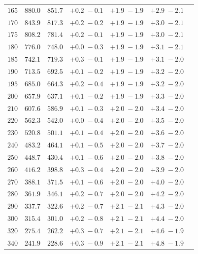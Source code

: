 \begin{table}
\begin{tabular}{ccccccc}
 $ 165$ & $  880.0$ & $  851.7$ & $ +0.2 \; -\!0.1$ & $ +1.9 \; -\!1.9$ & $ +2.9 \; -\!2.1$ \\
 $ 170$ & $  843.9$ & $  817.3$ & $ +0.2 \; -\!0.2$ & $ +1.9 \; -\!1.9$ & $ +3.0 \; -\!2.1$ \\
 $ 175$ & $  808.2$ & $  781.4$ & $ +0.2 \; -\!0.1$ & $ +1.9 \; -\!1.9$ & $ +3.0 \; -\!2.1$ \\
 $ 180$ & $  776.0$ & $  748.0$ & $ +0.0 \; -\!0.3$ & $ +1.9 \; -\!1.9$ & $ +3.1 \; -\!2.1$ \\
 $ 185$ & $  742.1$ & $  719.3$ & $ +0.3 \; -\!0.1$ & $ +1.9 \; -\!1.9$ & $ +3.1 \; -\!2.0$ \\
 $ 190$ & $  713.5$ & $  692.5$ & $ +0.1 \; -\!0.2$ & $ +1.9 \; -\!1.9$ & $ +3.2 \; -\!2.0$ \\
 $ 195$ & $  685.0$ & $  664.3$ & $ +0.2 \; -\!0.4$ & $ +1.9 \; -\!1.9$ & $ +3.2 \; -\!2.0$ \\
 $ 200$ & $  657.9$ & $  637.1$ & $ +0.1 \; -\!0.2$ & $ +1.9 \; -\!1.9$ & $ +3.3 \; -\!2.0$ \\
 $ 210$ & $  607.6$ & $  586.9$ & $ +0.1 \; -\!0.3$ & $ +2.0 \; -\!2.0$ & $ +3.4 \; -\!2.0$ \\
 $ 220$ & $  562.3$ & $  542.0$ & $ +0.0 \; -\!0.4$ & $ +2.0 \; -\!2.0$ & $ +3.5 \; -\!2.0$ \\
 $ 230$ & $  520.8$ & $  501.1$ & $ +0.1 \; -\!0.4$ & $ +2.0 \; -\!2.0$ & $ +3.6 \; -\!2.0$ \\
 $ 240$ & $  483.2$ & $  464.1$ & $ +0.1 \; -\!0.5$ & $ +2.0 \; -\!2.0$ & $ +3.7 \; -\!2.0$ \\
 $ 250$ & $  448.7$ & $  430.4$ & $ +0.1 \; -\!0.6$ & $ +2.0 \; -\!2.0$ & $ +3.8 \; -\!2.0$ \\
 $ 260$ & $  416.2$ & $  398.8$ & $ +0.3 \; -\!0.4$ & $ +2.0 \; -\!2.0$ & $ +3.9 \; -\!2.0$ \\
 $ 270$ & $  388.1$ & $  371.5$ & $ +0.1 \; -\!0.6$ & $ +2.0 \; -\!2.0$ & $ +4.0 \; -\!2.0$ \\
 $ 280$ & $  361.9$ & $  346.1$ & $ +0.2 \; -\!0.7$ & $ +2.0 \; -\!2.0$ & $ +4.2 \; -\!2.0$ \\
 $ 290$ & $  337.7$ & $  322.6$ & $ +0.2 \; -\!0.7$ & $ +2.1 \; -\!2.1$ & $ +4.3 \; -\!2.0$ \\
 $ 300$ & $  315.4$ & $  301.0$ & $ +0.2 \; -\!0.8$ & $ +2.1 \; -\!2.1$ & $ +4.4 \; -\!2.0$ \\
 $ 320$ & $  275.4$ & $  262.2$ & $ +0.3 \; -\!0.7$ & $ +2.1 \; -\!2.1$ & $ +4.6 \; -\!1.9$ \\
 $ 340$ & $  241.9$ & $  228.6$ & $ +0.3 \; -\!0.9$ & $ +2.1 \; -\!2.1$ & $ +4.8 \; -\!1.9$ \\

\end{tabular}
\end{table}

